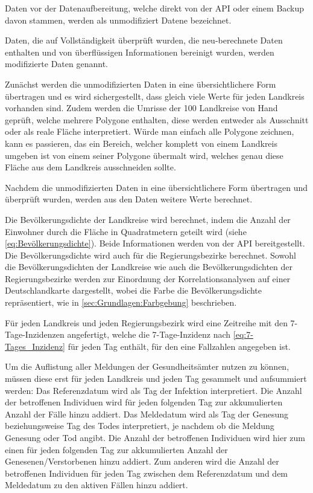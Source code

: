 Daten vor der Datenaufbereitung, welche direkt von der API oder einem Backup davon stammen, werden als \glqq{}unmodifiziert Datene\grqq{} bezeichnet. 

Daten, die auf Vollständigkeit überprüft wurden, die neu-berechnete Daten enthalten und von überflüssigen Informationen bereinigt wurden, werden \glqq{}modifizierte Daten\grqq{} genannt.

Zunächst werden die unmodifizierten Daten in eine übersichtlichere Form übertragen und es wird sichergestellt, dass gleich viele Werte für jeden Landkreis vorhanden sind. Zudem werden die Umrisse der 100 Landkreise von Hand geprüft, welche mehrere Polygone enthalten, diese werden entweder als Ausschnitt oder als reale Fläche interpretiert. Würde man einfach alle Polygone zeichnen, kann es passieren, das ein Bereich, welcher komplett von einem Landkreis umgeben ist von einem seiner Polygone übermalt wird, welches genau diese Fläche aus dem Landkreis ausschneiden sollte.

Nachdem die unmodifizierten Daten in eine übersichtlichere Form übertragen und überprüft wurden, werden aus den Daten weitere Werte berechnet.

Die Bevölkerungsdichte der Landkreise wird berechnet, indem die Anzahl der Einwohner durch die Fläche in Quadratmetern geteilt wird (siehe \autoref{eq:Bevölkerungsdichte}). Beide Informationen werden von der API bereitgestellt.
Die Bevölkerungsdichte wird auch für die Regierungsbezirke berechnet. 
Sowohl die Bevölkerungsdichten der Landkreise wie auch die Bevölkerungsdichten der Regierungsbezirke werden zur Einordnung der Korrelationsanalysen auf einer Deutschlandkarte dargestellt, wobei die Farbe die Bevölkerungsdichte repräsentiert, wie in \autoref{sec:Grundlagen:Farbgebung} beschrieben.

Für jeden Landkreis und jeden Regierungsbezirk wird eine Zeitreihe mit den 7-Tage-Inzidenzen angefertigt, welche die 7-Tage-Inzidenz nach \autoref{eq:7-Tages_Inzidenz} für jeden Tag enthält, für den eine Fallzahlen angegeben ist. 

Um die Auflistung aller Meldungen der Gesundheitsämter nutzen zu können, müssen diese erst für jeden Landkreis und jeden Tag gesammelt und aufsummiert werden:
Das Referenzdatum wird als Tag der Infektion interpretiert. Die Anzahl der betroffenen Individuen wird für jeden folgenden Tag zur akkumulierten Anzahl der Fälle hinzu addiert.
Das Meldedatum wird als Tag der Genesung beziehungsweise Tag des Todes interpretiert, je nachdem ob die Meldung Genesung oder Tod angibt. Die Anzahl der betroffenen Individuen wird hier zum einen für jeden folgenden Tag zur akkumulierten Anzahl der Genesenen/Verstorbenen hinzu addiert. Zum anderen wird die Anzahl der betroffenen Individuen für jeden Tag zwischen dem Referenzdatum und dem Meldedatum zu den aktiven Fällen hinzu addiert.

